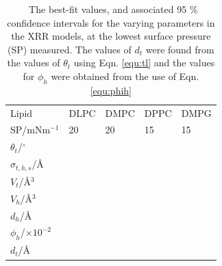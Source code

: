 \documentclass[11pt,a4paper]{article}
\begin{document}
\begin{table}
  \centering
	\caption{\ The best-fit values, and associated 95 \% confidence intervals for the varying parameters in the XRR models, at the lowest surface pressure (SP) measured. The values of $d_t$ were found from the values of $\theta_t$ using Eqn. \ref{equ:tl} and the values for $\phi_h$ were obtained from the use of Eqn. \ref{equ:phih}}
	\label{tab:liptab3}
	\begin{tabular}{l|l|l|l|l}
		Lipid & DLPC & DMPC & DPPC & DMPG \\
    SP/mNm$^{-1}$ & 20 & 20 & 15 & 15 \\
		\hline
		$\theta_t$/$^\circ$ &  &  &  &  \\
		$\sigma_{t,h,s}$/\AA &  &  &  &  \\
    \hline
    $V_t$/\AA$^3$ &  &  &  &  \\
		$V_h$/\AA$^3$ &  &  &  &  \\
		$d_h$/\AA &  &  &  &  \\
    \hline
    $\phi_h$/$\times10^{-2}$ &  &  &  &  \\
		$d_t$/\AA &  &  &  &  \\
	\end{tabular}
\end{table}
%
\end{document}
